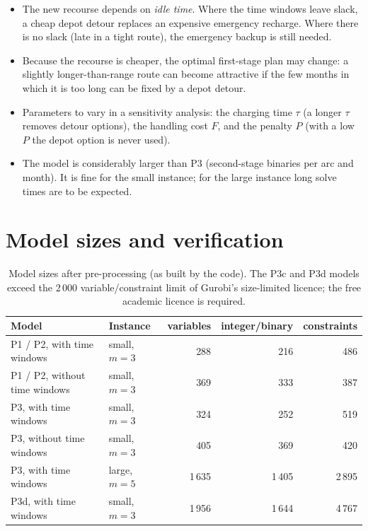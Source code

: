 \documentclass[11pt,a4paper]{article}
\theoremstyle{definition}
\begin{document}
\begin{notebox}
\begin{itemize}
\item The new recourse depends on \emph{idle time}. Where the time windows leave slack, a cheap depot detour replaces an expensive emergency recharge. Where there is no slack (late in a tight route), the emergency backup is still needed.
\item Because the recourse is cheaper, the optimal first-stage plan may change: a slightly longer-than-range route can become attractive if the few months in which it is too long can be fixed by a depot detour.
\item Parameters to vary in a sensitivity analysis: the charging time $\tau$ (a longer $\tau$ removes detour options), the handling cost $F$, and the penalty $P$ (with a low $P$ the depot option is never used).
\item The model is considerably larger than P3 (second-stage binaries per arc and month). It is fine for the small instance; for the large instance long solve times are to be expected.
\end{itemize}
\end{notebox}

\section{Model sizes and verification}
\begin{table}[H]
\centering\small
\begin{tabular}{@{}llrrr@{}}
\toprule
Model & Instance & variables & integer/binary & constraints\\
\midrule
P1 / P2, with time windows & small, $m=3$ & 288 & 216 & 486\\
P1 / P2, without time windows & small, $m=3$ & 369 & 333 & 387\\
P3, with time windows & small, $m=3$ & 324 & 252 & 519\\
P3, without time windows & small, $m=3$ & 405 & 369 & 420\\
P3, with time windows & large, $m=5$ & 1\,635 & 1\,405 & 2\,895\\
P3d, with time windows & small, $m=3$ & 1\,956 & 1\,644 & 4\,767\\
\bottomrule
\end{tabular}
\caption{Model sizes after pre-processing (as built by the code). The P3c and P3d models exceed the 2\,000 variable/constraint limit of Gurobi's size-limited licence; the free academic licence is required.}
\end{table}
\end{document}
